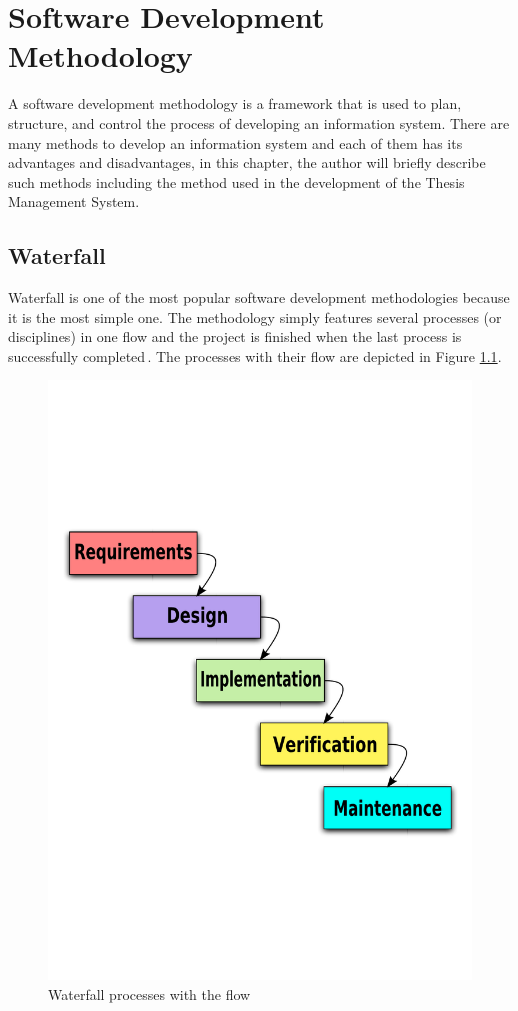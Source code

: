 \chapter{Software Development Methodology}

A software development methodology is a framework that is used to plan, structure, and control the process of developing an information system. There are many methods to develop an information system and each of them has its advantages and disadvantages, in this chapter, the author will briefly describe such methods including the method used in the development of the Thesis Management System.

\section{Waterfall}

Waterfall is one of the most popular software development methodologies because it is the most simple one. The methodology simply features several processes (or disciplines) in one flow and the project is finished when the last process is successfully completed\,\cite{agile-iterative-development}. The processes with their flow are depicted in Figure \ref{fig:waterfall}.

\begin{figure}[htbp]
    \centering
        \includegraphics[trim=0 200 0 200, clip, keepaspectratio, width=\textwidth]{./images/waterfall.pdf}
    \caption{Waterfall processes with the flow\,\cite{waterfall-img-src}}
    \label{fig:waterfall}
\end{figure}

